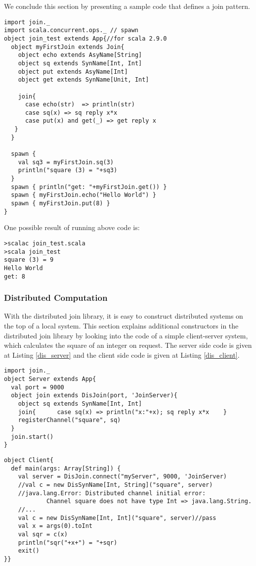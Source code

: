 We conclude this section by presenting a sample code that defines a join pattern.

\begin{lstlisting}[label=local_join_def_example, caption=Example code for defining channels and join patterns (join\_test.scala)]
import join._
import scala.concurrent.ops._ // spawn
object join_test extends App{//for scala 2.9.0
  object myFirstJoin extends Join{
    object echo extends AsyName[String]
    object sq extends SynName[Int, Int]
    object put extends AsyName[Int]
    object get extends SynName[Unit, Int]

    join{
      case echo(str)  => println(str)
      case sq(x) => sq reply x*x
      case put(x) and get(_) => get reply x
   }
  }

  spawn {
    val sq3 = myFirstJoin.sq(3)
    println("square (3) = "+sq3)
  }
  spawn { println("get: "+myFirstJoin.get()) }
  spawn { myFirstJoin.echo("Hello World") }
  spawn { myFirstJoin.put(8) }
}
\end{lstlisting}
One possible result of running above code is:
\begin{lstlisting}
>scalac join_test.scala
>scala join_test
square (3) = 9
Hello World
get: 8
\end{lstlisting}

\subsubsection{Distributed Computation}

With the distributed join library, it is easy to construct distributed systems on the top of a local system.  This section explains additional constructors in the distributed join library by looking into the code of a simple client-server system, which calculates the square of an integer on request.  The server side code is given at Listing \ref{dis_server} and the client side code is given at Listing \ref{dis_client}.

\begin{lstlisting}[label=dis_server, caption=Server.scala]
import join._
object Server extends App{
  val port = 9000
  object join extends DisJoin(port, 'JoinServer){
    object sq extends SynName[Int, Int]
    join{      case sq(x) => println("x:"+x); sq reply x*x    }
    registerChannel("square", sq)
  }
  join.start()
}
\end{lstlisting}
\begin{lstlisting}[label=dis_client, caption=Client.scala]
object Client{
  def main(args: Array[String]) {
    val server = DisJoin.connect("myServer", 9000, 'JoinServer)
    //val c = new DisSynName[Int, String]("square", server)
    //java.lang.Error: Distributed channel initial error: 
            Channel square does not have type Int => java.lang.String.
    //...
    val c = new DisSynName[Int, Int]("square", server)//pass
    val x = args(0).toInt
    val sqr = c(x)
    println("sqr("+x+") = "+sqr)
    exit()
}}
\end{lstlisting}

